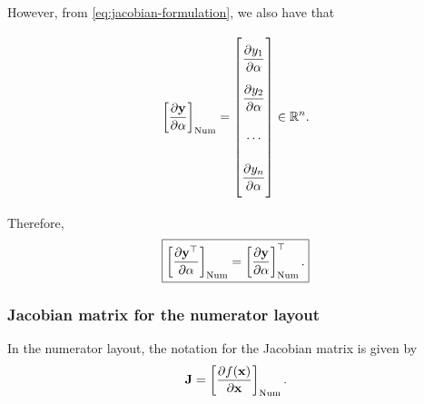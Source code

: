 However, from \eqref{eq:jacobian-formulation}, we also have that

\begin{align}
    \left[\dfrac{\partial \mathbf{y}}{\partial \alpha}\right]_{\textnormal{Num}} = \renewcommand{\arraystretch}{2.6}\begin{bmatrix}
        \dfrac{\partial y_{1}}{\partial \alpha} \\
        \dfrac{\partial y_{2}}{\partial \alpha} \\
        \cdots \\
        \dfrac{\partial y_{n}}{\partial \alpha}\vspace{1.3ex}
    \end{bmatrix} \in \mathbb{R}^{n}.
\end{align}

Therefore,
\begin{align}
    \boxed{\left[\dfrac{\partial \mathbf{y}^\top}{\partial \alpha}\right]_{\textnormal{Num}} = \left[\dfrac{\partial \mathbf{y}}{\partial \alpha}\right]_{\textnormal{Num}}^\top.}
\end{align}

\subsubsection{Jacobian matrix for the numerator layout}
In the numerator layout, the notation for the Jacobian matrix is given by
\begin{align}
    \label{eq:jacobian-numerator}
    \mathbf{J} = \left[ \frac{\partial f(\mathbf{x})}{\partial \mathbf{x}} \right]_{\textnormal{Num}}.
\end{align}

